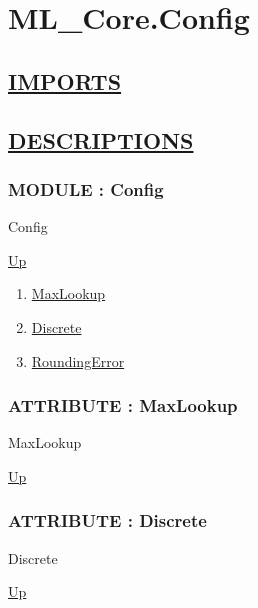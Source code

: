 \chapter*{ML\_Core.Config}
\hypertarget{ecldoc:toc:ML_Core.Config}{}

\section*{\underline{IMPORTS}}

\section*{\underline{DESCRIPTIONS}}
\subsection*{MODULE : Config}
\hypertarget{ecldoc:ML_Core.Config}{}
\begin{minipage}[t]{\textwidth}
\begin{flushleft}
 Config 
\end{flushleft}
\end{minipage}
\hyperlink{ecldoc:toc:ML_Core}{Up}

\par
\par
\begin{enumerate}
\item \hyperlink{ecldoc:ml_core.config.maxlookup}{MaxLookup}
\item \hyperlink{ecldoc:ml_core.config.discrete}{Discrete}
\item \hyperlink{ecldoc:ml_core.config.roundingerror}{RoundingError}
\end{enumerate}
\subsection*{ATTRIBUTE : MaxLookup}
\hypertarget{ecldoc:ml_core.config.maxlookup}{}
\begin{minipage}[t]{\textwidth}
\begin{flushleft}
 MaxLookup 
\end{flushleft}
\end{minipage}
\hyperlink{ecldoc:ML_Core.Config}{Up}

\par
\par
\subsection*{ATTRIBUTE : Discrete}
\hypertarget{ecldoc:ml_core.config.discrete}{}
\begin{minipage}[t]{\textwidth}
\begin{flushleft}
 Discrete 
\end{flushleft}
\end{minipage}
\hyperlink{ecldoc:ML_Core.Config}{Up}


